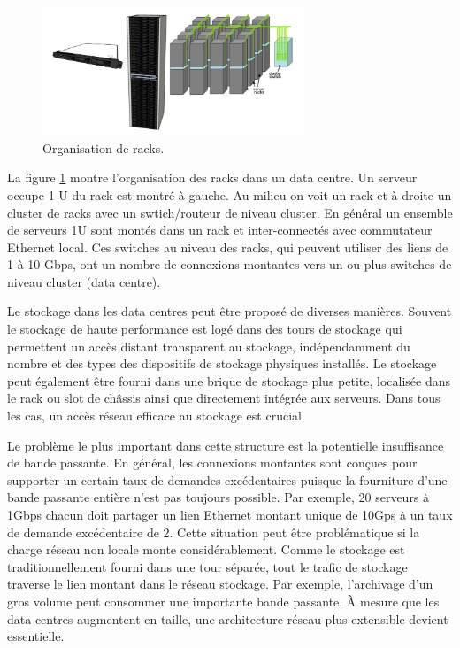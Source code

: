 \begin{figure}[h]
\begin{center}
\includegraphics[width=0.7\textwidth]{images/racks} 
\caption{Organisation de racks. \cite{datacenterAsComputerIntro}}\label{racks}
\end{center}
\end{figure}

La figure \ref{racks} montre l'organisation des racks dans un data centre. Un serveur occupe 1 U du rack est montré à gauche. Au milieu on voit un rack et à droite un cluster de racks avec un swtich/routeur de niveau cluster. En général un ensemble de serveurs 1U sont montés dans un rack et inter-connectés avec commutateur Ethernet local. Ces switches au niveau des racks, qui peuvent utiliser des liens de 1 à 10 Gbps, ont un nombre de connexions montantes vers un ou plus switches de niveau cluster (data centre).

Le stockage dans les data centres peut être proposé de diverses manières. Souvent le stockage de haute performance est logé dans des \og  tours de stockage \fg{} qui permettent un accès distant transparent au stockage, indépendamment du nombre et des types des dispositifs de stockage physiques installés. Le stockage peut également être fourni dans une \og  brique de stockage \fg{} plus petite, localisée dans le rack ou slot de châssis ainsi que directement intégrée aux serveurs. Dans tous les cas, un accès réseau efficace au stockage est crucial.

Le problème le plus important dans cette structure est la potentielle insuffisance de bande passante. En général, les connexions montantes sont conçues pour supporter un certain taux de demandes excédentaires puisque la fourniture d'une bande passante entière n'est pas toujours possible. Par exemple, 20 serveurs à 1Gbps chacun doit partager un lien Ethernet montant unique de 10Gps à un taux de demande excédentaire de 2. Cette situation peut être problématique si la charge réseau non locale monte considérablement. Comme le stockage est traditionnellement fourni dans une tour séparée, tout le trafic de stockage traverse le lien montant dans le réseau stockage. Par exemple, l'archivage d'un gros volume peut consommer une importante bande passante. À mesure que les data centres augmentent en taille, une architecture réseau plus extensible devient essentielle.


